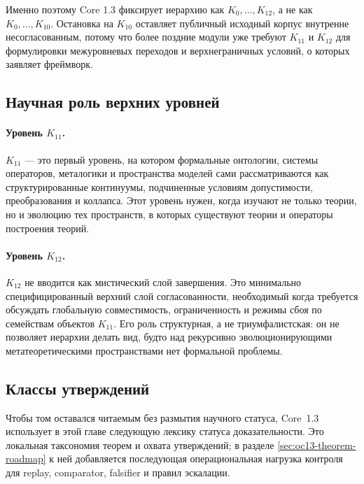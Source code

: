Именно поэтому Core 1.3 фиксирует иерархию как \(K_0,\dots,K_{12}\), а не
как \(K_0,\dots,K_{10}\). Остановка на \(K_{10}\) оставляет публичный
исходный корпус внутренне несогласованным, потому что более поздние модули уже
требуют \(K_{11}\) и \(K_{12}\) для формулировки межуровневых переходов и
верхнеграничных условий, о которых заявляет фреймворк.

\subsection{Научная роль верхних уровней}

\paragraph{Уровень \texorpdfstring{$K_{11}$}{K11}.}
\(K_{11}\) — это первый уровень, на котором формальные онтологии, системы
операторов, металогики и пространства моделей сами рассматриваются как
структурированные континуумы, подчиненные условиям допустимости,
преобразования и коллапса.
Этот уровень нужен, когда изучают не только теории, но и эволюцию тех
пространств, в которых существуют теории и операторы построения теорий.

\paragraph{Уровень \texorpdfstring{$K_{12}$}{K12}.}
\(K_{12}\) не вводится как мистический слой завершения.
Это минимально специфицированный верхний слой согласованности, необходимый
когда требуется обсуждать глобальную совместимость, ограниченность и режимы
сбоя по семействам объектов \(K_{11}\).
Его роль структурная, а не триумфалистская: он не позволяет иерархии
делать вид, будто над рекурсивно эволюционирующими метатеоретическими
пространствами нет формальной проблемы.

\subsection{Классы утверждений}

Чтобы том оставался читаемым без размытия научного статуса, Core~1.3 использует
в этой главе следующую лексику статуса доказательности. Это локальная
таксономия теорем и охвата утверждений; в разделе
\ref{sec:oc13-theorem-roadmap} к ней добавляется последующая
операциональная нагрузка контроля для replay, comparator, falsifier и
правил эскалации.

